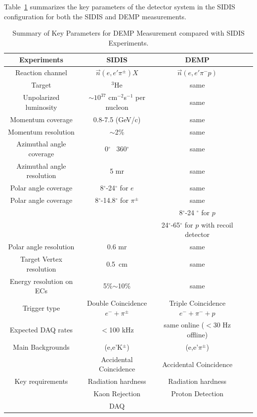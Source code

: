 Table~\ref{table:key_par_sidis_dvcs} summarizes the key parameters of the
detector system in the SIDIS configuration for both the SIDIS and DEMP
measurements.
\begin{table}\centering
\begin{tabular}{|c|c|c|c|c|}
\hline
Experiments                & SIDIS                    & DEMP  \\\hline
Reaction channel           & $\vec{n}(e,e'\pi^{\pm})X$ & $\vec{n}(e,e'\pi^{-}p)$	\\\hline
Target                     & $^3$He                   &same 	\\\hline
Unpolarized luminosity     & $\sim10^{37}$ cm$^{-2}$s$^{-1}$ per nucleon & same	\\\hline 
Momentum coverage          & 0.8-7.5 (GeV/c)          &same 	\\\hline
Momentum resolution        & $\sim$2\%                & same\\\hline
Azimuthal angle coverage   & 0$^{\circ}$ ~360$^{\circ}$ & same	\\\hline
Azimuthal angle resolution & 5 mr                     & same	\\\hline
Polar angle coverage       & 8$^{\circ}$-24$^{\circ}$ for $e$ &  same \\\hline
Polar angle coverage       & 8$^{\circ}$-14.8$^{\circ}$ for $\pi^{\pm}$  &  same 	\\\hline
                           &                          & 8$^{\circ}$-24 $^{\circ}$ for $p$ \\\hline
                           &                          & 24$^{\circ}$-65$^{\circ}$ for $p$ with recoil detector         \\\hline
Polar angle resolution     & 0.6 mr                   & same	\\\hline
Target Vertex resolution   & 0.5~cm                   & same \\\hline
 Energy resolution on ECs  & 5\%$\sim$10\%            & same   \\\hline
Trigger type               & Double Coincidence $e^-+\pi^{\pm}$ & Triple Coincidence $e^-+\pi^{-}+p$\\\hline
Expected DAQ rates         &  $<$100 kHz              &  same online ($<$30 Hz offline)\\\hline
Main Backgrounds           & (e,e'K$^\pm$)            &(e,e'$\pi^{\pm}$) \\
                           &   Accidental Coincidence & Accidental Coincidence	\\\hline
Key requirements           &  Radiation hardness      & Radiation hardness	\\
                           &  Kaon Rejection          & Proton Detection	\\
                           &  DAQ                     &       \\
                        \hline
\end{tabular}
\caption{\footnotesize{Summary of Key Parameters for DEMP Measurement compared
    with SIDIS Experiments.}}\label{table:program_summary}
\label{table:key_par_sidis_dvcs}
\end{table} 

